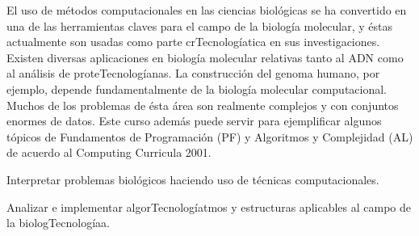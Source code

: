 \begin{syllabus}


\begin{justification}
El uso de métodos computacionales en las ciencias biológicas
se ha convertido en una de las herramientas claves para el
campo de la biología molecular, y éstas actualmente son usadas
como parte crTecnologíatica en sus investigaciones. Existen diversas
aplicaciones en biología molecular relativas tanto al ADN como
al análisis de proteTecnologíanas. La construcción del genoma humano,
por ejemplo, depende fundamentalmente de la biología molecular
computacional. Muchos de los problemas de ésta área son realmente
complejos y con conjuntos enormes de datos. Este curso además
puede servir para ejemplificar algunos tópicos de Fundamentos
de Programación (PF) y Algoritmos y Complejidad (AL) de
acuerdo al Computing Curricula 2001.
\end{justification}

\begin{goals}
\item Interpretar problemas biológicos haciendo uso de técnicas computacionales.
\item Analizar e implementar algorTecnologíatmos y estructuras aplicables al campo de la biologTecnologíaa.
\end{goals}

\begin{outcomes}
\end{outcomes}


\end{syllabus}
